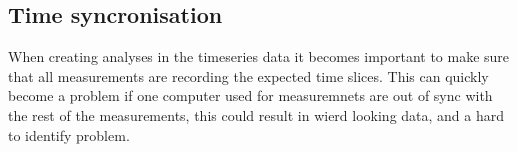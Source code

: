\subsection{Time syncronisation}
When creating analyses in the timeseries data it becomes important to make sure that all measurements are recording the expected time slices. This can quickly become a problem if one computer used for measuremnets are out of sync with the rest of the measurements, this could result in wierd looking data, and a hard to identify problem.